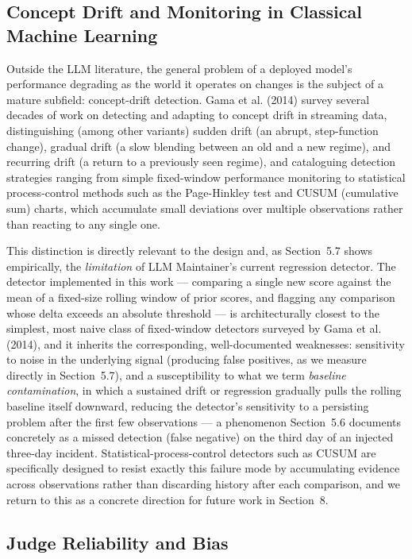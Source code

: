 \documentclass[11pt,a4paper]{article}
\begin{document}
\subsection{Concept Drift and Monitoring in Classical Machine Learning}

Outside the LLM literature, the general problem of a deployed
model's performance degrading as the world it operates
on changes is the subject of a mature subfield: concept-drift detection.
Gama et al. (2014) survey several decades of work on detecting and
adapting to concept drift in streaming data, distinguishing (among other
variants) sudden drift (an abrupt, step-function change), gradual drift
(a slow blending between an old and a new regime), and recurring drift
(a return to a previously seen regime), and cataloguing detection
strategies ranging from simple fixed-window performance monitoring to
statistical process-control methods such as the Page-Hinkley test and
CUSUM (cumulative sum) charts, which accumulate small deviations over
multiple observations rather than reacting to any single one.

This distinction is directly relevant to the design and, as Section~5.7
shows empirically, the \emph{limitation} of LLM
Maintainer's current regression detector. The detector
implemented in this work --- comparing a single new score against the
mean of a fixed-size rolling window of prior scores, and flagging any
comparison whose delta exceeds an absolute threshold --- is
architecturally closest to the simplest, most naive class of
fixed-window detectors surveyed by Gama et al. (2014), and it inherits
the corresponding, well-documented weaknesses: sensitivity to noise in
the underlying signal (producing false positives, as we measure directly
in Section~5.7), and a susceptibility to what we term \emph{baseline
contamination}, in which a sustained drift or regression gradually pulls
the rolling baseline itself downward, reducing the
detector's sensitivity to a persisting problem after the
first few observations --- a phenomenon Section~5.6 documents
concretely as a missed detection (false negative) on the third day of an
injected three-day incident. Statistical-process-control detectors such
as CUSUM are specifically designed to resist exactly this failure mode
by accumulating evidence across observations rather than discarding
history after each comparison, and we return to this as a concrete
direction for future work in Section~8.

\subsection{Judge Reliability and Bias}
\end{document}
